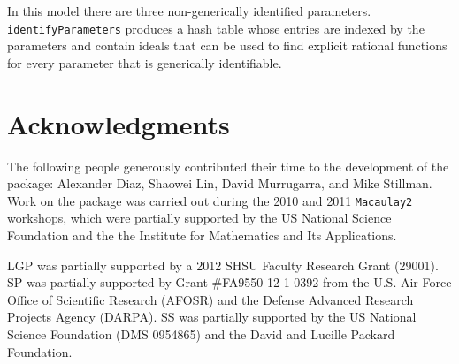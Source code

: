 \documentclass[letterpaper]{article}
\theoremstyle{definition}
\begin{document}
In this model there are three non-generically identified parameters.  \texttt{identifyParameters} produces a hash table whose entries
are indexed by the parameters and contain ideals that can be used to find
explicit rational functions for every parameter that is generically
identifiable.

\section*{Acknowledgments }
The following people generously contributed their time to the
development of the package:  Alexander Diaz, Shaowei Lin, David Murrugarra, and Mike 
Stillman.  Work on the package was carried out during the 2010 and 2011
{\tt Macaulay2} workshops, which were partially supported by the US National 
Science Foundation and the the Institute for Mathematics and Its
Applications.

LGP was partially supported by a 2012 SHSU Faculty Research Grant (29001).
SP was partially supported by Grant \#FA9550-12-1-0392 from the U.S. Air Force Office of Scientific Research (AFOSR) and the Defense Advanced Research Projects Agency (DARPA).
SS was partially supported by the US National Science Foundation (DMS 0954865) and the David and Lucille Packard Foundation.
\end{document}
